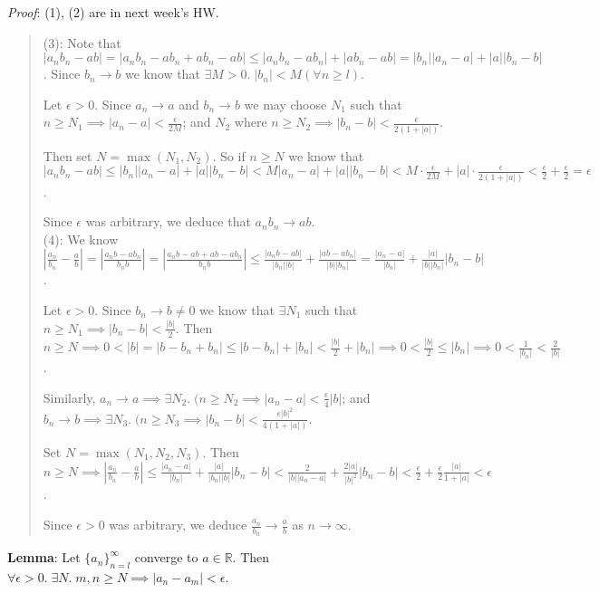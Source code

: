 \documentclass[11pt]{article}
\begin{document}
\emph{Proof}: (1), (2) are in next week's HW.
\begin{quote}\vspace{-0.3cm}
(3): Note that $|a_nb_n - ab| = |a_nb_n - ab_n + ab_n - ab| \leq |a_nb_n - ab_n| + |ab_n - ab| = |b_n||a_n-a| + |a||b_n - b|$. Since $b_n \to b$ we know that $\exists M > 0.\; |b_n| < M (\forall n \geq l)$.

Let $\epsilon > 0$. Since $a_n \to a$ and $b_n \to b$ we may choose $N_1$ such that $n \geq N_1 \implies |a_n - a| < \frac{\epsilon}{2M}$; and $N_2$ where $n \geq N_2 \implies |b_n - b| < \frac{\epsilon}{2(1+|a|)}$.

Then set $N = \max(N_1, N_2)$. So if $n \geq N$ we know that $|a_nb_n - ab| \leq |b_n||a_n-a| + |a||b_n-b| < M|a_n - a| + |a||b_n-b| < M \cdot \frac{\epsilon}{2M} + |a| \cdot \frac{\epsilon}{2(1+|a|)} < \frac{\epsilon}{2} +\frac{\epsilon}{2} = \epsilon$.

Since $\epsilon$ was arbitrary, we deduce that $a_nb_n \to ab$.\\

(4): We know $|\frac{a_n}{b_n} - \frac{a}{b}| = |\frac{a_nb - ab_n}{b_nb}| = |\frac{a_nb - ab + ab - ab_n}{b_nb}| \leq \frac{|a_nb - ab|}{|b_n||b|} + \frac{|ab - ab_n|}{|b||b_n|} = \frac{|a_n-a|}{|b_n|} + \frac{|a|}{|b||b_n|} |b_n - b|$.

Let $\epsilon > 0$. Since $b_n \to b \neq 0$ we know that $\exists N_1$ such that $n \geq N_1 \implies |b_n - b| < \frac{|b|}{2}$. Then $n \geq N \implies 0 < |b| = |b - b_n + b_n| \leq |b-b_n| + |b_n| < \frac{|b|}{2} + |b_n| \implies 0 < \frac{|b|}{2} \leq |b_n| \implies 0 < \frac{1}{|b_n|} < \frac{2}{|b|}$.

Similarly, $a_n \to a \implies \exists N_2 .\; (n \geq N_2 \implies |a_n - a| < \frac{\epsilon}{4} |b|$; and\\
$b_n \to b \implies \exists N_3.\; (n \geq N_3 \implies |b_n - b| < \frac{\epsilon |b|^2}{4(1+|a|)}$.

Set $N = \max(N_1, N_2, N_3)$. Then $n \geq N \implies |\frac{a_n}{b_n} - \frac{a}{b}| \leq \frac{|a_n-a|}{|b_n|} + \frac{|a|}{|b_n||b|} |b_n - b| < \frac{2}{|b| |a_n - a|} + \frac{2|a|}{|b|^2} |b_n - b| < \frac{\epsilon}{2} + \frac{\epsilon}{2} \frac{|a|}{1+|a|} < \epsilon$.

Since $\epsilon > 0$ was arbitrary, we deduce $\frac{a_n}{b_n} \to \frac{a}{b}$ as $n \to \infty$.
\end{quote}

\textbf{Lemma}: Let $\{a_n\}_{n=l}^\infty$ converge to $a \in \mathbb{R}$. Then $\forall \epsilon > 0.\; \exists N.\; m, n \geq N \implies |a_n - a_m| < \epsilon$.
\end{document}

